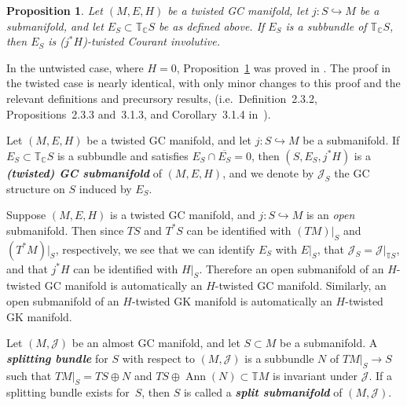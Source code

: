 \documentclass[11pt]{article}
\newtheorem{Proposition}[Theorem]{Proposition}
\numberwithin{equation}{section}
\newcommand{\deff}[1]{\textbf{\emph{#1}}}
\newcommand{\hookfunc}[3]{#1 \colon #2 \hookrightarrow #3}
\newcommand{\pont}[1]{\mathbb{T} {#1}}
\newcommand{\cpont}[1]{\mathbb{T}_{\mathbb{C}} {#1}}
\newcommand{\tang}{T}
\begin{document}
\begin{Proposition} \label{prop6}
Let $(M,E,H)$ be a twisted GC manifold, let $\hookfunc{j}{S}{M}$ be a submanifold, and let $E_S \subset \cpont{S}$ be as defined above.  If $E_S$ is a subbundle of $\cpont{S}$, then $E_S$ is ($j^*H$)-twisted Courant involutive.
\end{Proposition}


In the untwisted case, where $H = 0$, Proposition~\ref{prop6} was proved in \cite[Corollary 3.1.4]{courant}.  The proof in the twisted case is nearly identical, with only minor changes to this proof and the relevant def\/initions and precursory results, (i.e.\ Def\/inition~2.3.2, Propositions~2.3.3 and~3.1.3, and Corollary~3.1.4 in~\cite{courant}).


\begin{Definition}
Let $(M,E,H)$ be a twisted GC manifold, and let $\hookfunc{j}{S}{M}$ be a submanifold.  If $E_S \subset \cpont{S}$ is a subbundle and satisf\/ies $E_S \cap \overline{E_S} = 0$, then $(S,E_S,j^* H)$ is a \deff{(twisted) GC submanifold} of $(M,E,H)$, and we denote by $\mathcal{J}_S$ the GC structure on $S$ induced by $E_S$.
\end{Definition}


\begin{Remark} \label{rem2}
Suppose $(M,E,H)$ is a twisted GC manifold, and $\hookfunc{j}{S}{M}$ is an \emph{open} submanifold.  Then since $\tang S$ and $\tang^* S$ can be identif\/ied with $(\tang M)|_S$ and $(\tang^* M)|_S$, respectively, we see that we can identify $E_S$ with $E|_S$, that $\mathcal{J}_S = \mathcal{J}|_{\pont{S}}$, and that $j^* H$ can be identif\/ied with $H|_S$.  Therefore an open submanifold of an $H$-twisted GC manifold is automatically an $H$-twisted GC manifold.  Similarly, an open submanifold of an $H$-twisted GK manifold is automatically an $H$-twisted GK manifold.
\end{Remark}


\begin{Definition}
Let $(M, \mathcal{J})$ be an almost GC manifold, and let $S \subset M$ be a submanifold.  A \deff{splitting bundle} for $S$ with respect to $(M, \mathcal{J})$ is a subbundle $N$ of $\tang M|_S \to S$ such that $\tang M|_S = \tang S \oplus N$ and $\tang S \oplus \operatorname{Ann} (N) \subset \pont{M}$ is invariant under $\mathcal{J}$. If a splitting bundle exists for~$S$, then $S$ is called a \deff{split submanifold} of $(M,\mathcal{J})$.
\end{Definition}
\end{document}
